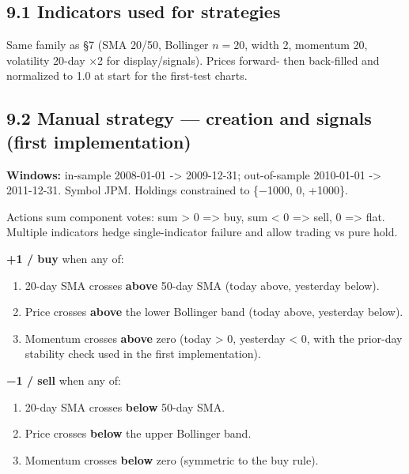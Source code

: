 \documentclass[
  11pt,
]{article}
\providecommand{\tightlist}{%
  \setlength{\itemsep}{0pt}\setlength{\parskip}{0pt}}
\begin{document}
\subsection{9.1 Indicators used for
strategies}\label{indicators-used-for-strategies}

Same family as §7 (SMA 20/50, Bollinger \(n=20\), width 2, momentum 20,
volatility 20-day ×2 for display/signals). Prices forward- then
back-filled and normalized to 1.0 at start for the first-test charts.

\subsection{9.2 Manual strategy --- creation and signals (first
implementation)}\label{manual-strategy-creation-and-signals-first-implementation}

\textbf{Windows:} in-sample 2008-01-01 -\textgreater{} 2009-12-31;
out-of-sample 2010-01-01 -\textgreater{} 2011-12-31. Symbol JPM.
Holdings constrained to \{−1000, 0, +1000\}.

Actions sum component votes: sum \textgreater{} 0 =\textgreater{} buy,
sum \textless{} 0 =\textgreater{} sell, 0 =\textgreater{} flat. Multiple
indicators hedge single-indicator failure and allow trading vs pure
hold.

\textbf{+1 / buy} when any of:

\begin{enumerate}
\def\labelenumi{\arabic{enumi}.}
\tightlist
\item
  20-day SMA crosses \textbf{above} 50-day SMA (today above, yesterday
  below).\\
\item
  Price crosses \textbf{above} the lower Bollinger band (today above,
  yesterday below).\\
\item
  Momentum crosses \textbf{above} zero (today \textgreater{} 0,
  yesterday \textless{} 0, with the prior-day stability check used in
  the first implementation).
\end{enumerate}

\textbf{−1 / sell} when any of:

\begin{enumerate}
\def\labelenumi{\arabic{enumi}.}
\tightlist
\item
  20-day SMA crosses \textbf{below} 50-day SMA.\\
\item
  Price crosses \textbf{below} the upper Bollinger band.\\
\item
  Momentum crosses \textbf{below} zero (symmetric to the buy rule).
\end{enumerate}
\end{document}
